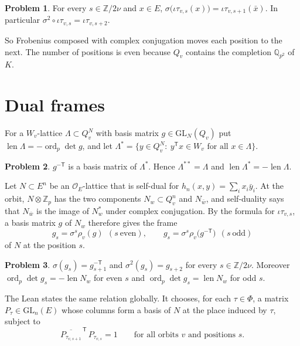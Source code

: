 \documentclass[reqno]{amsart}
\theoremstyle{definition}
\newtheorem{problem}{Problem}[section]
\theoremstyle{plain}
\theoremstyle{remark}
\newcommand{\Z}{\mathbb Z}
\newcommand{\Q}{\mathbb Q}
\newcommand{\Oc}{\mathcal O}
\newcommand{\len}{\operatorname{len}}
\newcommand{\ord}{\operatorname{ord}}
\begin{document}
\begin{problem}\label{pr:frob}
For every \(s\in\Z/2\nu\) and \(x\in E\), \(\sigma\big(\iota\tau_{v,s}(x)\big)=\iota\tau_{v,s+1}(\bar x)\).  In particular \(\sigma^2\circ\iota\tau_{v,s}=\iota\tau_{v,s+2}\).
\end{problem}

So Frobenius composed with complex conjugation moves each position to the next.  The number of positions is even because \(Q_v\) contains the completion \(\Q_{p^2}\) of \(K\).

\section{Dual frames}\label{sec:frames}
For a \(W_v\)-lattice \(\Lambda\subset Q_v^N\) with basis matrix \(g\in\mathrm{GL}_N(Q_v)\) put \(\len\Lambda=-\ord_p\det g\), and let \(\Lambda^*=\{y\in Q_v^N:\ y^{\mathsf T}x\in W_v\text{ for all }x\in\Lambda\}\).

\begin{problem}\label{pr:dual-lattice}
\(g^{-\mathsf T}\) is a basis matrix of \(\Lambda^*\).  Hence \(\Lambda^{**}=\Lambda\) and \(\len\Lambda^*=-\len\Lambda\).
\end{problem}

Let \(N\subset E^n\) be an \(\Oc_E\)-lattice that is self-dual for \(h_n(x,y)=\sum_ix_i\bar y_i\).  At the orbit, \(N\otimes\Z_p\) has the two components \(N_w\subset Q_v^n\) and \(N_{\bar w}\), and self-duality says that \(N_{\bar w}\) is the image of \(N_w^*\) under complex conjugation.  By the formula for \(\iota\tau_{v,s}\), a basis matrix \(g\) of \(N_w\) therefore gives the frame
\[
 g_s=\sigma^s\rho_v(g)\ \ (s\ \text{even}),\qquad g_s=\sigma^s\rho_v\big(g^{-\mathsf T}\big)\ \ (s\ \text{odd})
\]
of \(N\) at the position \(s\).

\begin{problem}\label{pr:frames}
\(\sigma(g_s)=g_{s+1}^{-\mathsf T}\) and \(\sigma^2(g_s)=g_{s+2}\) for every \(s\in\Z/2\nu\).  Moreover \(\ord_p\det g_s=-\len N_w\) for even \(s\) and \(\ord_p\det g_s=\len N_w\) for odd \(s\).
\end{problem}

The Lean states the same relation globally.  It chooses, for each \(\tau\in\Phi\), a matrix \(P_\tau\in\mathrm{GL}_n(E)\) whose columns form a basis of \(N\) at the place induced by \(\tau\), subject to
\[
 \overline{P_{\tau_{v,s+1}}}^{\,\mathsf T}\,P_{\tau_{v,s}}=1\qquad\text{for all orbits \(v\) and positions \(s\)}.
\]
\end{document}
